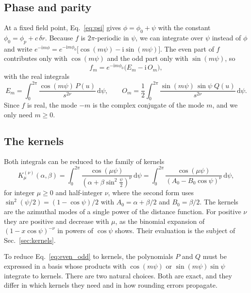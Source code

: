 \documentclass[11pt]{article}
\newcommand{\ii}{\mathrm{i}}
\newcommand{\dd}{\mathrm{d}}
\newcommand{\Kmn}[2]{K_{#1}^{(#2)}}
\begin{document}
\subsection{Phase and parity}

At a fixed field point, Eq.~\eqref{eq:psi} gives $\phi=\phi_0+\psi$ with the
constant $\phi_0=\phi_p+c\,\delta r$. Because $f$ is $2\pi$-periodic in $\psi$,
we can integrate over $\psi$ instead of $\phi$ and write
$e^{-\ii m\phi}=e^{-\ii m\phi_0}\bigl[\cos(m\psi)-\ii\sin(m\psi)\bigr]$. The
even part of $f$ contributes only with $\cos(m\psi)$ and the odd part only with
$\sin(m\psi)$, so
\begin{equation}
  \label{eq:phase}
  f_m = e^{-\ii m\phi_0}\bigl(E_m - \ii\,O_m\bigr),
\end{equation}
with the real integrals
\begin{equation}
  \label{eq:even_odd}
  E_m = \int_0^{2\pi}\frac{\cos(m\psi)\,P(u)}{s^{2\nu}}\,\dd\psi, \qquad
  O_m = \frac12\int_0^{2\pi}\frac{\sin(m\psi)\,\sin\psi\;Q(u)}{s^{2\nu}}\,\dd\psi .
\end{equation}
Since $f$ is real, the mode $-m$ is the complex conjugate of the mode $m$, and
we only need $m\ge0$.

\subsection{The kernels}

Both integrals can be reduced to the family of kernels
\begin{equation}
  \label{eq:kernel}
  \Kmn{\mu}{\nu}(\alpha,\beta) = \int_0^{2\pi}\frac{\cos(\mu\psi)}{(\alpha+\beta\sin^2\frac{\psi}{2})^{\nu}}\,\dd\psi
  = \int_0^{2\pi}\frac{\cos(\mu\psi)}{(A_0 - B_0\cos\psi)^{\nu}}\,\dd\psi,
\end{equation}
for integer $\mu\ge0$ and half-integer $\nu$, where the second form uses
$\sin^2(\psi/2)=(1-\cos\psi)/2$ with $A_0=\alpha+\beta/2$ and $B_0=\beta/2$.
The kernels are the azimuthal modes of a single power of the distance function.
For positive $\nu$ they are positive and decrease with $\mu$, as the binomial
expansion of $(1-x\cos\psi)^{-\nu}$ in powers of $\cos\psi$ shows. Their
evaluation is the subject of Sec.~\ref{sec:kernels}.

To reduce Eq.~\eqref{eq:even_odd} to kernels, the polynomials $P$ and $Q$ must
be expressed in a basis whose products with $\cos(m\psi)$ or
$\sin(m\psi)\sin\psi$ integrate to kernels. There are two natural choices.
Both are exact, and they differ in which kernels they need and in how
rounding errors propagate.
\end{document}
